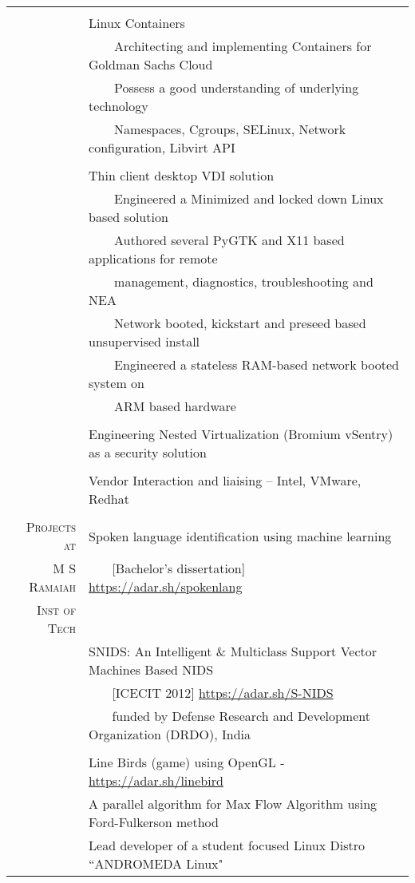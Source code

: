 \documentclass[a4paper,10pt]{article} %
\newcommand{\tabitem}{~~\llap{\textbullet}~~}
\begin{document}
\begin{tabular}{rp{12cm}}
&\\
& Linux Containers\\
& \tabitem Architecting and implementing Containers for Goldman Sachs Cloud \\
& \tabitem Possess a good understanding of underlying technology \\
& ~~~~Namespaces, Cgroups, SELinux, Network configuration, Libvirt API \\
&\\
& Thin client desktop VDI solution\\
& \tabitem Engineered a Minimized and locked down Linux based solution \\
& \tabitem Authored several PyGTK and X11 based applications for remote \\
& ~~~~management, diagnostics, troubleshooting and NEA \\
& \tabitem Network booted, kickstart and preseed based unsupervised install \\
& \tabitem Engineered a stateless RAM-based network booted system on\\ & ~~~~ARM based hardware\\
&\\
& Engineering Nested Virtualization (Bromium vSentry) as a security solution\\
& \\
& Vendor Interaction and liaising – Intel, VMware, Redhat \\
&\\
\textsc{Projects at} & Spoken language identification using machine learning \\ 
\textsc{M S Ramaiah} & ~~~ [Bachelor's dissertation] \qquad \href{https://adar.sh/spokenlang}{https://adar.sh/spokenlang} \\
\textsc{Inst of Tech} & \\
& SNIDS: An Intelligent \& Multiclass Support Vector Machines Based NIDS \\ 
& ~~~ [ICECIT 2012] \qquad \href{https://adar.sh/S-NIDS}{https://adar.sh/S-NIDS} \\
& ~~~ funded by Defense Research and Development Organization (DRDO), India \\
& \\
& Line Birds (game) using OpenGL - \href{https://adar.sh/linebird}{https://adar.sh/linebird}\\
& A parallel algorithm for Max Flow Algorithm using Ford-Fulkerson method \\
& Lead developer of a student focused Linux Distro ``ANDROMEDA Linux" \\
\end{tabular}
\end{document}
